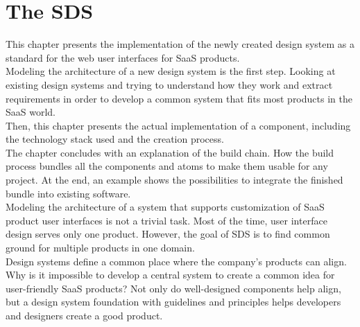 \newpage
\section{The \acl{SDS}}\label{saas_design_system}
This chapter presents the implementation of the newly created design system as a standard for the web user interfaces for SaaS products. \\
Modeling the architecture of a new design system is the first step. Looking at existing design systems and trying to understand how they work and extract requirements in order to develop a common system that fits most products in the SaaS world. \\
Then, this chapter presents the actual implementation of a component, including the technology stack used and the creation process. \\
The chapter concludes with an explanation of the build chain. How the build process bundles all the components and atoms to make them usable for any project. At the end, an example shows the possibilities to integrate the finished bundle into existing software.\\
Modeling the architecture of a system that supports customization of SaaS product user interfaces is not a trivial task. Most of the time, user interface design serves only one product. However, the goal of \ac{SDS} is to find common ground for multiple products in one domain. \\
Design systems define a common place where the company's products can align. Why is it impossible to develop a central system to create a common idea for user-friendly SaaS products? Not only do well-designed components help align, but a design system foundation with guidelines and principles helps developers and designers create a good product. \\




